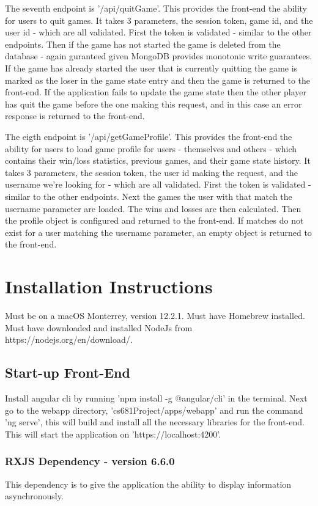 \documentclass[12pt]{article}
\begin{document}
The seventh endpoint is '/api/quitGame'. This provides the front-end the ability for users to quit games. It takes 3 parameters, the session token, game id, and the user id - which are all validated. First the token is validated - similar to the other endpoints. Then if the game has not started the game is deleted from the database - again guranteed given MongoDB provides monotonic write guarantees. If the game has already started the user that is currently quitting the game is marked as the loser in the game state entry and then the game is returned to the front-end. If the application fails to update the game state then the other player has quit the game before the one making this request, and in this case an error response is returned to the front-end.

The eigth endpoint is '/api/getGameProfile'. This provides the front-end the ability for users to load game profile for users - themselves and others - which contains their win/loss statistics, previous games, and their game state history. It takes 3 parameters, the session token, the user id making the request, and the username we're looking for - which are all validated. First the token is validated - similar to the other endpoints. Next the games the user with that match the username parameter are loaded. The wins and losses are then calculated. Then the profile object is configured and returned to the front-end. If matches do not exist for a user matching the username parameter, an empty object is returned to the front-end.

\section{Installation Instructions}
Must be on a macOS Monterrey, version 12.2.1. Must have Homebrew installed. Must have downloaded and installed NodeJs from https://nodejs.org/en/download/.
\subsection{Start-up Front-End}
Install angular cli by running 'npm install -g @angular/cli' in the terminal. Next go to the webapp directory, 'cs681Project/apps/webapp' and run the command 'ng serve', this will build and install all the necessary libraries for the front-end. This will start the application on 'https://localhost:4200'.
\subsubsection{RXJS Dependency - version 6.6.0}
This dependency is to give the application the ability to display information asynchronously.
\end{document}
